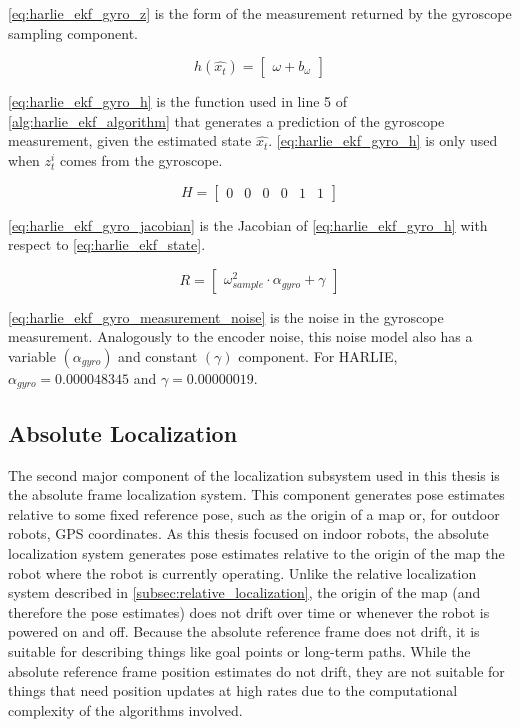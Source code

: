 \eqref{eq:harlie_ekf_gyro_z} is the form of the measurement returned by the gyroscope sampling component.

\begin{equation}
	h\left(\hat{x_t}\right) =
	\begin{bmatrix}
		\omega + b_{\omega}
	\end{bmatrix}
	\label{eq:harlie_ekf_gyro_h}
\end{equation}

\eqref{eq:harlie_ekf_gyro_h} is the function used in line 5 of \autoref{alg:harlie_ekf_algorithm} that generates a prediction of the gyroscope measurement, given the estimated state $\hat{x_t}$. \eqref{eq:harlie_ekf_gyro_h} is only used when $z_t^i$ comes from the gyroscope.

\begin{equation}
	H =
	\begin{bmatrix}
		0 & 0 & 0 & 0 & 1 & 1
	\end{bmatrix}
	\label{eq:harlie_ekf_gyro_jacobian}
\end{equation}

\eqref{eq:harlie_ekf_gyro_jacobian} is the Jacobian of \eqref{eq:harlie_ekf_gyro_h} with respect to \eqref{eq:harlie_ekf_state}.

\begin{equation}
	R =
	\begin{bmatrix}
		\omega_{sample}^2 \cdot \alpha_{gyro} + \gamma
	\end{bmatrix}
	\label{eq:harlie_ekf_gyro_measurement_noise}
\end{equation}

\eqref{eq:harlie_ekf_gyro_measurement_noise} is the noise in the gyroscope measurement. Analogously to the encoder noise, this noise model also has a variable $\left(\alpha_{gyro}\right)$ and constant $\left(\gamma\right)$ component. For HARLIE, $\alpha_{gyro} = 0.000048345$ and $\gamma = 0.00000019$.

\subsection{Absolute Localization}\label{subsec:absolute_localization}

The second major component of the localization subsystem used in this thesis is the absolute frame localization system. This component generates pose estimates relative to some fixed reference pose, such as the origin of a map or, for outdoor robots, GPS coordinates. As this thesis focused on indoor robots, the absolute localization system generates pose estimates relative to the origin of the map the robot where the robot is currently operating. Unlike the relative localization system described in \autoref{subsec:relative_localization}, the origin of the map (and therefore the pose estimates) does not drift over time or whenever the robot is powered on and off. Because the absolute reference frame does not drift, it is suitable for describing things like goal points or long-term paths. While the absolute reference frame position estimates do not drift, they are not suitable for things that need position updates at high rates due to the computational complexity of the algorithms involved.


